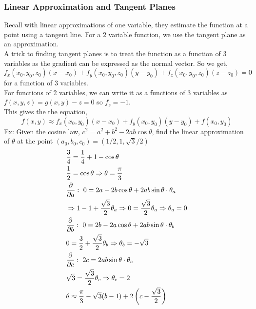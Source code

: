 \documentclass[11pt, fleqn]{article}
\begin{document}
\subsubsection{Linear Approximation and Tangent Planes}
Recall with linear approximations of one variable, they estimate the function at a point using a tangent line. For a 2 variable function, we use the tangent plane as an approximation.\\
A trick to finding tangent planes is to treat the function as a function of 3 variables as the gradient can be expressed as the normal vector. So we get,
$$f_x(x_0,y_0,z_0)(x-x_0)+f_y(x_0,y_0,z_0)(y-y_0)+f_z(x_0,y_0,z_0)(z-z_0)=0$$
for a function of 3 variables.\\
For functions of 2 variables, we can write it as a functions of 3 variables as $f(x,y,z)=g(x,y)-z=0$ so $f_z=-1$.\\
This gives the the equation,
$$f(x,y)\approx f_x(x_0,y_0)(x-x_0)+f_y(x_0,y_0)(y-y_0)+f(x_0,y_0)$$
Ex: Given the cosine law, $c^2=a^2+b^2-2ab\cos\theta$, find the linear approximation of $\theta$ at the point $(a_0,b_0,c_0)=(1/2,1,\sqrt{3}/2)$
\begin{align*}
    &\frac{3}{4}=\frac{1}{4}+1-\cos\theta\\
    &\frac{1}{2}=\cos\theta\Ra \theta=\frac{\pi}{3}\\
    &\frac{\partial}{\partial a}:\ 0=2a-2b\cos\theta+2ab\sin\theta\cdot\theta_a\\
    &\Ra 1-1+\frac{\sqrt{3}}{2}\theta_a\Ra 0=\frac{\sqrt{3}}{2}\theta_a\Ra \theta_a=0\\
    &\frac{\partial}{\partial b}:\ 0=2b-2a\cos\theta+2ab\sin\theta\cdot\theta_b\\
    &0=\frac{3}{2}+\frac{\sqrt{3}}{2}\theta_b\Ra \theta_b=-\sqrt{3}\\
    &\frac{\partial}{\partial c}:\ 2c=2ab\sin\theta\cdot\theta_c\\
    &\sqrt{3}=\frac{\sqrt{3}}{2}\theta_c\Ra \theta_c=2\\
    &\theta\approx\frac{\pi}{3}-\sqrt{3}(b-1)+2\brround{c-\frac{\sqrt{3}}{2}}
\end{align*}
\end{document}
